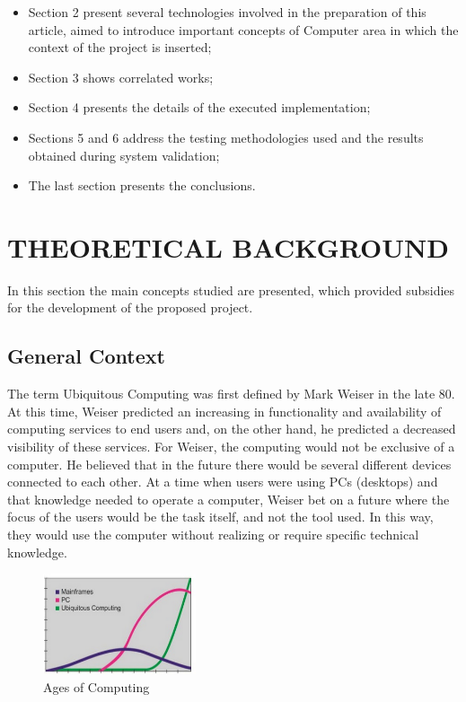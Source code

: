 \documentclass{acm_proc_article-sp}
\begin{document}
\begin{itemize}
\item Section 2 present several technologies involved in the preparation of this article, aimed to introduce important concepts of Computer area in which the context of the project is inserted;
\item Section 3 shows correlated works;
\item Section 4 presents the details of the executed implementation;
\item Sections 5 and 6 address the testing methodologies used and the results obtained during system validation; 
\item The last section presents the conclusions.
\end{itemize}

\section{THEORETICAL BACKGROUND}
In this section the main concepts studied are presented, which provided subsidies for the development of the proposed project.

\subsection{General Context}
The term Ubiquitous Computing was first defined by Mark Weiser \cite{weiser1991} in the late 80. At this time, Weiser predicted an increasing in functionality and availability of computing services to end users and, on the other hand, he predicted a decreased visibility of these services. For Weiser, the computing would not be exclusive of a computer. He believed that in the future there would be several different devices connected to each other. At a time when users were using PCs (desktops) and that knowledge needed to operate a computer,  Weiser bet on a future where the focus of the users would be the task itself, and not the tool used. In this way, they would use the computer without realizing or require specific technical knowledge. \cite{weiser1994world}

\begin{figure}[h]
\centering
    \includegraphics[width=0.4\textwidth,natwidth=610,natheight=642]{pictures/era.png}
    \caption{Ages of Computing}
    \label{fig:era}
\end{figure}
\end{document}

